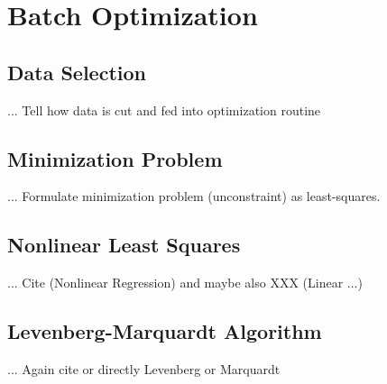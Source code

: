 \chapter{Batch Optimization}
\label{chap:batch}

\section{Data Selection}
... Tell how data is cut and fed into optimization routine

\section{Minimization Problem}
... Formulate minimization problem (unconstraint) as least-squares.

\section{Nonlinear Least Squares}
... Cite \cite{Seber} (Nonlinear Regression) and maybe also XXX (Linear ...)

\section{Levenberg-Marquardt Algorithm}
... Again cite \cite{Seber} or directly Levenberg or Marquardt
